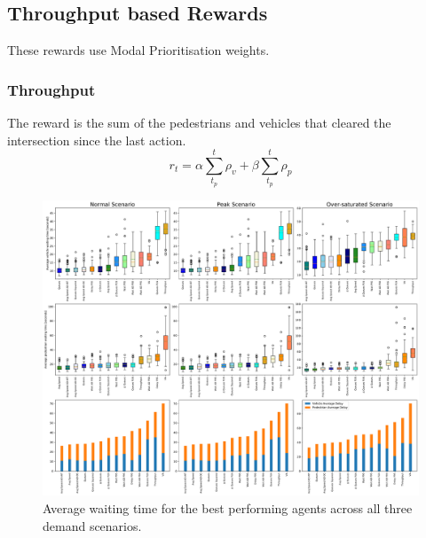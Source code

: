 \documentclass[conference]{IEEEtran}
\begin{document}
\subsection{Throughput based Rewards}
These rewards use Modal Prioritisation weights.
\subsubsection{Throughput}
The reward is the sum of the pedestrians and vehicles that cleared the intersection since the last action.
\begin{equation}
    r_t = \alpha \sum_{t_p}^t \rho_v + \beta \sum_{t_p}^t \rho_p
\label{eq:throughput}
\end{equation}
\begin{figure}                                                
\centering                                                    
\includegraphics[width=\textwidth]{9grid_ordered_boxplot_all.pdf}                                    
\caption{Average waiting time for the best performing agents across all three demand scenarios.}                                  
\label{fig:results_9_grid}                                               
\end{figure}
\end{document}
